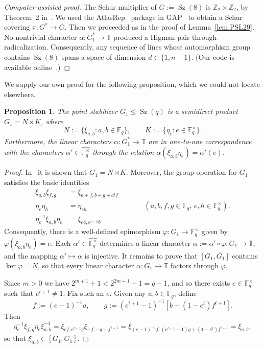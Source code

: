 \documentclass[11pt]{article}
\newtheorem{proposition}[theo]{Proposition}
\theoremstyle{definition}
\numberwithin{equation}{section}
\begin{document}
\begin{proof}[Computer-assisted proof]
The Schur multiplier of $G := \operatorname{Sz}(8)$ is $\mathbb{Z}_2 \times \mathbb{Z}_2$, by Theorem~2 in~\cite{AlperinGorenstein:66}.
We used the AtlasRep~\cite{AtlasRep} package in GAP~\cite{GAP} to obtain a Schur covering $\pi \colon G^* \to G$.
Then we proceeded as in the proof of Lemma~\ref{lem.PSL29}.
No nontrivial character $\alpha \colon G_1^* \to \mathbb{T}$ produced a Higman pair through radicalization.
Consequently, any sequence of lines whose automorphism group contains $\operatorname{Sz}(8)$ spans a space of dimension $d \in \{1,n-1\}$.
(Our code is available online~\cite{github}.)
\end{proof}

We supply our own proof for the following proposition, which we could not locate elsewhere.

\begin{proposition}
\label{prop:Szstab}
The point stabilizer $G_1 \leq \operatorname{Sz}(q)$ is a semidirect product $G_1 = N \rtimes K$, where 
\[ N := \{ \xi_{a,b} : a,b \in \mathbb{F}_q \}, \qquad K := \{ \eta_e : e \in \mathbb{F}_q^\times \}. \]
Furthermore, the linear characters $\alpha\colon G_1^* \to \mathbb{T}$ are in one-to-one correspondence with the characters $\alpha'\in\widehat{\mathbb{F}_{q}^\times}$ through the relation $\alpha(\xi_{a,b} \eta_e )=\alpha'(e)$.
\end{proposition}

\begin{proof}
In~\cite[Lemma~XI.3.1]{HuppertB:82:III} it is shown that $G_1 = N \rtimes K$.
Moreover, the group operation for $G_1$ satisfies the basic identities
\begin{align*}
\xi_{a,b} \xi_{f,g} &= \xi_{a+f, b + g + a^t f} \\
\eta_e \eta_h &= \eta_{eh} \qquad \qquad \qquad \qquad (a,b,f,g \in \mathbb{F}_q,\, e, h \in \mathbb{F}_q^\times). \\
\eta_e^{-1} \xi_{a,b} \eta_e &= \xi_{ea, e^{t + 1} b}
\end{align*}
Consequently, there is a well-defined epimorphism $\varphi \colon G_1 \to \mathbb{F}_q^\times$ given by $\varphi(\xi_{a,b} \eta_e) = e$.
Each $\alpha' \in \widehat{ \mathbb{F}_q^\times }$ determines a linear character $\alpha := \alpha' \circ \varphi \colon G_1 \to \mathbb{T}$, and the mapping $\alpha' \mapsto \alpha$ is injective.
It remains to prove that $[G_1,G_1]$ contains $\ker \varphi = N$, so that every linear character $\alpha \colon G_1 \to \mathbb{T}$ factors through $\varphi$.

Since $m > 0$ we have $2^{m+1}+1 < 2^{2m+1} - 1 = q-1$, and so there exists $e \in \mathbb{F}_q^\times$ such that $e^{t+1} \neq 1$.
Fix such an $e$.
Given any $a,b \in \mathbb{F}_q$, define 
\[
f := (e-1)^{-1}a,
\qquad
g := (e^{t + 1} - 1)^{-1}[b-(1-e^t)f^{t+1}].
\]
Then
\[
\eta_{e}^{-1} \xi_{f,g} \eta_e \xi_{a,b}^{-1}
=
\xi_{ef, e^{t + 1} g} \xi_{-f,-g+f^{t+1}}
=
\xi_{ (e-1)^{-1} f, (e^{t+1}-1)g+(1-e^t)f^{t+1}}
=
\xi_{a,b},
\]
so that $\xi_{a,b} \in [G_1,G_1]$.
\end{proof}
\end{document}
